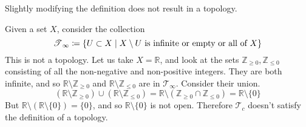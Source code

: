   Slightly modifying the definition does not result in a topology. 

  \begin{example}
    Given a set $X$, consider the collection 
    \begin{equation}
      \T_\infty \coloneqq \{U \subset X \mid X \setminus U \text{ is infinite or empty or all of }X \}
    \end{equation}
    This is not a topology. Let us take $X = \mathbb{R}$, and look at the sets $\mathbb{Z}_{\geq 0}, \mathbb{Z}_{\leq 0}$ consisting of all the non-negative and non-positive integers. They are both infinite, and so $\mathbb{R} \setminus \mathbb{Z}_{\geq 0}$ and $\mathbb{R} \setminus \mathbb{Z}_{\leq 0}$ are in $\mathcal{T}_\infty$. Consider their union. 
    \begin{equation}
      (\mathbb{R} \setminus \mathbb{Z}_{\geq 0}) \cup (\mathbb{R} \setminus \mathbb{Z}_{\leq 0}) = \mathbb{R} \setminus (\mathbb{Z}_{\geq 0} \cap \mathbb{Z}_{\leq 0}) = \mathbb{R} \setminus \{0\}
    \end{equation}
    But $\mathbb{R} \setminus (\mathbb{R} \setminus \{0\}) = \{0\}$, and so $\mathbb{R} \setminus \{0\}$ is not open. Therefore $\mathcal{T}_c$ doesn't satisfy the definition of a topology. 
  \end{example}

